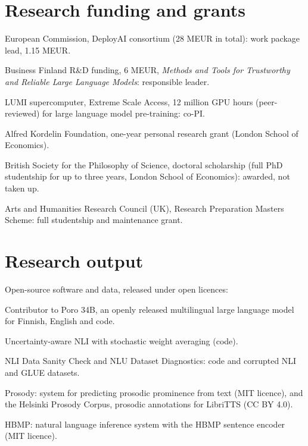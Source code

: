 \documentclass[12pt,a4paper]{article}
\newenvironment{entries}{%
  \begin{list}{}{%
    \setlength{\labelwidth}{2.7cm}%
    \setlength{\labelsep}{0.3cm}%
    \setlength{\leftmargin}{3.0cm}%
    \setlength{\itemsep}{2pt}%
    \setlength{\parsep}{0pt}%
    \setlength{\topsep}{1pt}%
    \renewcommand{\makelabel}[1]{##1\hfil}}}%
  {\end{list}}
\begin{document}
\section{Research funding and grants}
\begin{entries}
  \item[2023] European Commission, DeployAI consortium (28 MEUR in total): work package lead, 1.15 MEUR.
  \item[2023--2024] Business Finland R\&D funding, 6 MEUR, \emph{Methods and Tools for Trustworthy and Reliable Large Language Models}: responsible leader.
  \item[2023] LUMI supercomputer, Extreme Scale Access, 12 million GPU hours (peer-reviewed) for large language model pre-training: co-PI.
  \item[2011--2012] Alfred Kordelin Foundation, one-year personal research grant (London School of Economics).
  \item[2011] British Society for the Philosophy of Science, doctoral scholarship (full PhD studentship for up to three years, London School of Economics): awarded, not taken up.
  \item[2005--2006] Arts and Humanities Research Council (UK), Research Preparation Masters Scheme: full studentship and maintenance grant.
\end{entries}

\section{Research output}
Open-source software and data, released under open licences:
\begin{entries}
  \item[2024] Contributor to Poro 34B, an openly released multilingual large language model for Finnish, English and code.
  \item[2023] Uncertainty-aware NLI with stochastic weight averaging (code).
  \item[2021--2022] NLI Data Sanity Check and NLU Dataset Diagnostics: code and corrupted NLI and GLUE datasets.
  \item[2019] Prosody: system for predicting prosodic prominence from text (MIT licence), and the Helsinki Prosody Corpus, prosodic annotations for LibriTTS (CC BY 4.0).
  \item[2018] HBMP: natural language inference system with the HBMP sentence encoder (MIT licence).
\end{entries}
\end{document}
